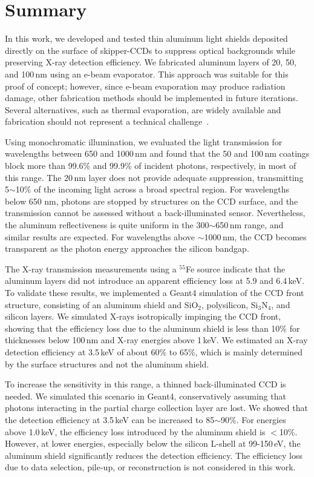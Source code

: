 \documentclass[twocolumn]{aastex631}
\begin{document}
\section{Summary} \label{sec:summary}



In this work, we developed and tested thin aluminum light shields deposited directly on the surface of skipper-CCDs to suppress optical backgrounds while preserving X-ray detection efficiency. We fabricated aluminum layers of 20, 50, and 100\,nm using an e-beam evaporator. This approach was suitable for this proof of concept; however, since e-beam evaporation may produce radiation damage, other fabrication methods should be implemented in future iterations. Several alternatives, such as thermal evaporation, are widely available and fabrication should not represent a technical challenge~\cite{rexis}.

Using monochromatic illumination, we evaluated the light transmission for wavelengths between 650 and 1000\,nm and found that the 50 and 100\,nm coatings block more than 99.6\% and 99.9\% of incident photons, respectively, in most of this range. The 20\,nm layer does not provide adequate suppression, transmitting 5$\sim$10\% of the incoming light across a broad spectral region. For wavelengths below 650 nm, photons are stopped by structures on the CCD surface, and the transmission cannot be assessed without a back-illuminated sensor. Nevertheless, the aluminum reflectiveness is quite uniform in the 300$\sim$650\,nm range, and similar results are expected. For wavelengths above $\sim$1000\,nm, the CCD becomes transparent as the photon energy approaches the silicon bandgap. 

The X-ray transmission measurements using a $^{55}$Fe source indicate that the aluminum layers did not introduce an apparent efficiency loss at 5.9 and 6.4\,keV. To validate these results, we implemented a Geant4 simulation of the CCD front structure, consisting of an aluminum shield and SiO$_2$, polysilicon, Si$_3$N$_4$, and silicon layers. We simulated X-rays isotropically impinging the CCD front, showing that the efficiency loss due to the aluminum shield is less than 10\% for thicknesses below 100\,nm and X-ray energies above 1\,keV. We estimated an X-ray detection efficiency at 3.5\,keV of about 60\% to 65\%, which is mainly determined by the surface structures and not the aluminum shield. 

To increase the sensitivity in this range, a thinned back-illuminated CCD is needed. We simulated this scenario in Geant4, conservatively assuming that photons interacting in the partial charge collection layer are lost. We showed that the detection efficiency at 3.5\,keV can be increased to 85$\sim$90\%. For energies above 1.0\,keV, the efficiency loss introduced by the aluminum shield is $<$10\%. However, at lower energies, especially below the silicon L-shell at 99-150\,eV, the aluminum shield significantly reduces the detection efficiency. The efficiency loss due to data selection, pile-up, or reconstruction is not considered in this work. 
\end{document}
